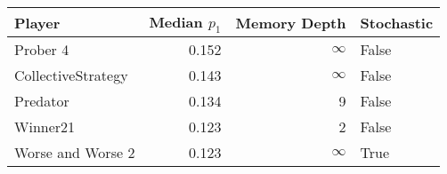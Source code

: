 \begin{tabular}{lrrl}
\toprule
             Player &  Median $p_1$ &  Memory Depth & Stochastic \\
\midrule
           Prober 4 &         0.152 &            \(\infty\) &      False \\
 CollectiveStrategy &         0.143 &            \(\infty\) &      False \\
           Predator &         0.134 &             9 &      False \\
           Winner21 &         0.123 &             2 &      False \\
  Worse and Worse 2 &         0.123 &            \(\infty\) &       True \\
\bottomrule
\end{tabular}
